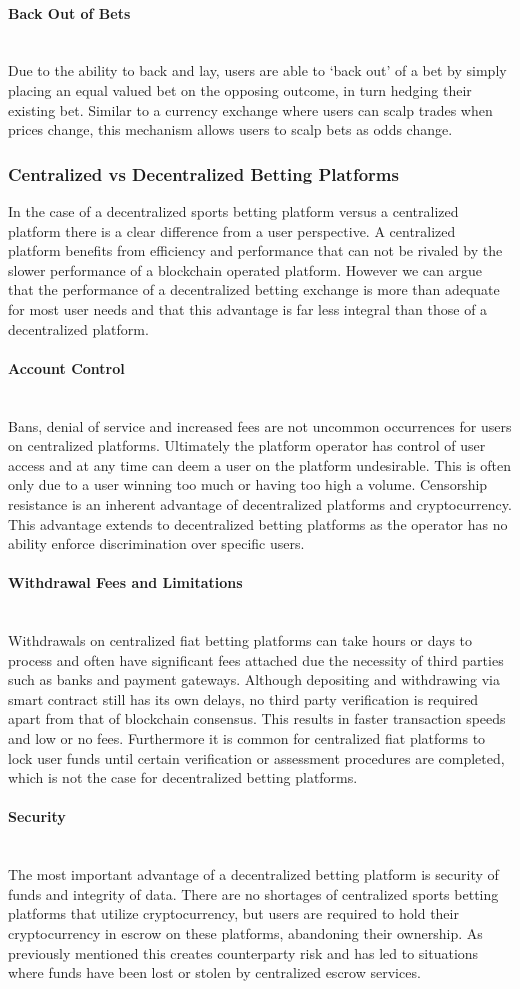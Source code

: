 \documentclass{article}
\newcommand{\myparagraph}[1]{\paragraph{#1}\mbox{}\\ \newline}
\begin{document}
				\myparagraph{Back Out of Bets}
Due to the ability to back and lay, users are able to ‘back out’ of a bet by simply placing an equal valued bet on the opposing outcome, in turn hedging their existing bet. Similar to a currency exchange where users can scalp trades when prices change, this mechanism allows users to scalp bets as odds change.

			\subsubsection{Centralized vs Decentralized Betting Platforms}

In the case of a decentralized sports betting platform versus a centralized platform there is a clear difference from a user perspective. A centralized platform benefits from efficiency and performance that can not be rivaled by the slower performance of a blockchain operated platform. However we can argue that the performance of a decentralized betting exchange is more than adequate for most user needs and that this advantage is far less integral than those of a decentralized platform.

				\myparagraph{Account Control}
Bans, denial of service and increased fees are not uncommon occurrences for users on centralized platforms. Ultimately the platform operator has control of user access and at any time can deem a user on the platform undesirable. This is often only due to a user winning too much or having too high a volume. Censorship resistance is an inherent advantage of decentralized platforms and cryptocurrency. This advantage extends to decentralized betting platforms as the operator has no ability enforce discrimination over specific users.

				\myparagraph{Withdrawal Fees and Limitations}
Withdrawals on centralized fiat betting platforms can take hours or days to process and often have significant fees attached due the necessity of third parties such as banks and payment gateways. Although depositing and withdrawing via smart contract still has its own delays, no third party verification is required apart from that of blockchain consensus. This results in faster transaction speeds and low or no fees. Furthermore it is common for centralized fiat platforms to lock user funds until certain verification or assessment procedures are completed, which is not the case for decentralized betting platforms.

				\myparagraph{Security}
The most important advantage of a decentralized betting platform is security of funds and integrity of data. There are no shortages of centralized sports betting platforms that utilize cryptocurrency, but users are required to hold their cryptocurrency in escrow on these platforms, abandoning their ownership. As previously mentioned this creates counterparty risk and has led to situations where funds have been lost or stolen by centralized escrow services.
\end{document}
